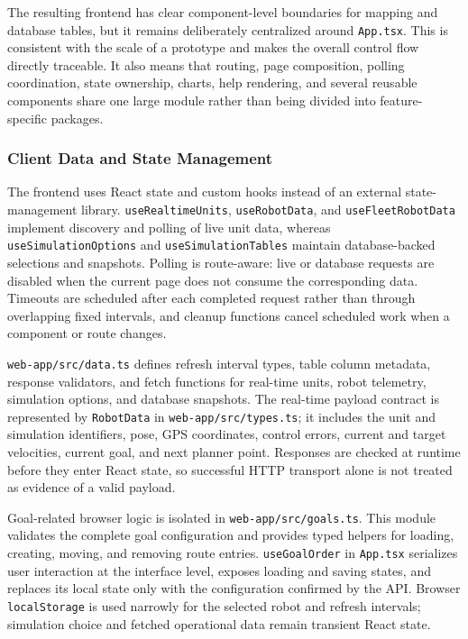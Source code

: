 The resulting frontend has clear component-level boundaries for mapping and database tables, but it remains deliberately centralized around \texttt{App.tsx}. This is consistent with the scale of a prototype and makes the overall control flow directly traceable. It also means that routing, page composition, polling coordination, state ownership, charts, help rendering, and several reusable components share one large module rather than being divided into feature-specific packages.

\subsubsection{Client Data and State Management}

The frontend uses React state and custom hooks instead of an external state-management library. \texttt{useRealtimeUnits}, \texttt{useRobotData}, and \texttt{useFleetRobotData} implement discovery and polling of live unit data, whereas \texttt{useSimulationOptions} and \texttt{useSimulationTables} maintain database-backed selections and snapshots. Polling is route-aware: live or database requests are disabled when the current page does not consume the corresponding data. Timeouts are scheduled after each completed request rather than through overlapping fixed intervals, and cleanup functions cancel scheduled work when a component or route changes.

\texttt{web-app/src/data.ts} defines refresh interval types, table column metadata, response validators, and fetch functions for real-time units, robot telemetry, simulation options, and database snapshots. The real-time payload contract is represented by \texttt{RobotData} in \texttt{web-app/src/types.ts}; it includes the unit and simulation identifiers, pose, GPS coordinates, control errors, current and target velocities, current goal, and next planner point. Responses are checked at runtime before they enter React state, so successful HTTP transport alone is not treated as evidence of a valid payload.

Goal-related browser logic is isolated in \texttt{web-app/src/goals.ts}. This module validates the complete goal configuration and provides typed helpers for loading, creating, moving, and removing route entries. \texttt{useGoalOrder} in \texttt{App.tsx} serializes user interaction at the interface level, exposes loading and saving states, and replaces its local state only with the configuration confirmed by the API. Browser \texttt{localStorage} is used narrowly for the selected robot and refresh intervals; simulation choice and fetched operational data remain transient React state.

